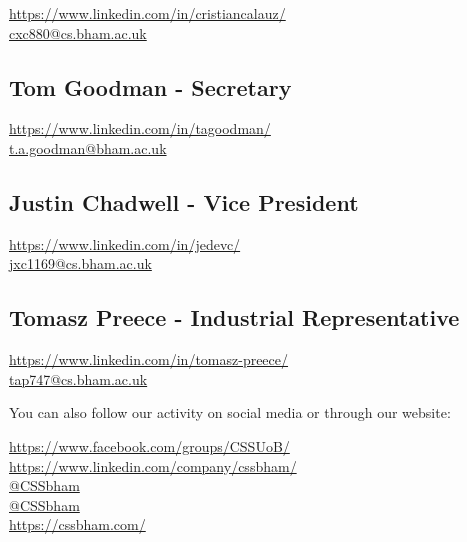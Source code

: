 \documentclass{article}
\begin{document}
\noindent\hspace{1pt}\faLinkedin \hspace{3.5pt} \url{https://www.linkedin.com/in/cristiancalauz/} \\
\faEnvelope \hspace{0.1cm} \href{mailto:cxc880@cs.bham.ac.uk}{cxc880@cs.bham.ac.uk}

\subsection*{Tom Goodman - Secretary}

\noindent\hspace{1pt}\faLinkedin \hspace{3.5pt} \url{https://www.linkedin.com/in/tagoodman/} \\
\faEnvelope \hspace{0.1cm} \href{mailto:t.a.goodman@bham.ac.uk}{t.a.goodman@bham.ac.uk}

\subsection*{Justin Chadwell - Vice President}

\noindent\hspace{1pt}\faLinkedin \hspace{3.5pt} \url{https://www.linkedin.com/in/jedevc/} \\
\faEnvelope \hspace{0.1cm} \href{mailto:jxc1169@cs.bham.ac.uk}{jxc1169@cs.bham.ac.uk}

\subsection*{Tomasz Preece - Industrial Representative}

\noindent\hspace{1pt}\faLinkedin \hspace{3.5pt} \url{https://www.linkedin.com/in/tomasz-preece/} \\
\faEnvelope \hspace{0.1cm} \href{mailto:tap747@cs.bham.ac.uk}{tap747@cs.bham.ac.uk}

\vspace{1cm}

\noindent You can also follow our activity on social media or through our website:
\medskip

\noindent\faFacebook  \hspace{0.3cm} \url{https://www.facebook.com/groups/CSSUoB/} \\
\noindent\hspace{1pt}\faLinkedin \hspace{3.5pt} \url{https://www.linkedin.com/company/cssbham/} \\
\noindent \faTwitter  \hspace{0.1cm} \href{https://twitter.com/cssbham}{@CSSbham} \\
\faInstagram  \hspace{0.1cm} \href{https://www.instagram.com/cssbham/}{@CSSbham} \\
\faMousePointer  \hspace{0.225cm} \url{https://cssbham.com/}
\end{document}
